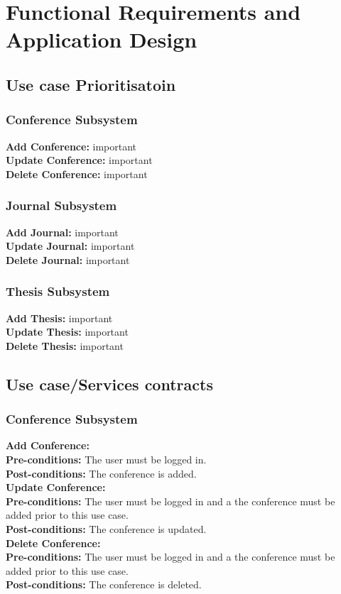 \documentclass{article}
\begin{document}
	\section{Functional Requirements and Application Design}
		\subsection{Use case Prioritisatoin}
			\subsubsection{Conference Subsystem}
				\textbf{Add Conference:} important\\
				\textbf{Update Conference:} important\\
				\textbf{Delete Conference:} important
			\subsubsection{Journal Subsystem}
				\textbf{Add Journal:} important\\
				\textbf{Update Journal:} important\\
				\textbf{Delete Journal:} important
			\subsubsection{Thesis Subsystem}
				\textbf{Add Thesis:} important\\
				\textbf{Update Thesis:} important\\
				\textbf{Delete Thesis:} important
		\subsection{Use case/Services contracts}
			\subsubsection{Conference Subsystem}
				\textbf{Add Conference:}\\
					\indent \textbf{Pre-conditions:} The user must be logged in.\\
					\indent \textbf{Post-conditions:} The conference is added.\\
				\textbf{Update Conference:}\\
					\indent \textbf{Pre-conditions:} The user must be logged in and a the conference must be added prior to this use case.\\
					\indent \textbf{Post-conditions:} The conference is updated.\\
				\textbf{Delete Conference:}\\
					\indent \textbf{Pre-conditions:} The user must be logged in and a the conference must be added prior to this use case.\\
					\indent \textbf{Post-conditions:} The conference is deleted.\\
\end{document}
